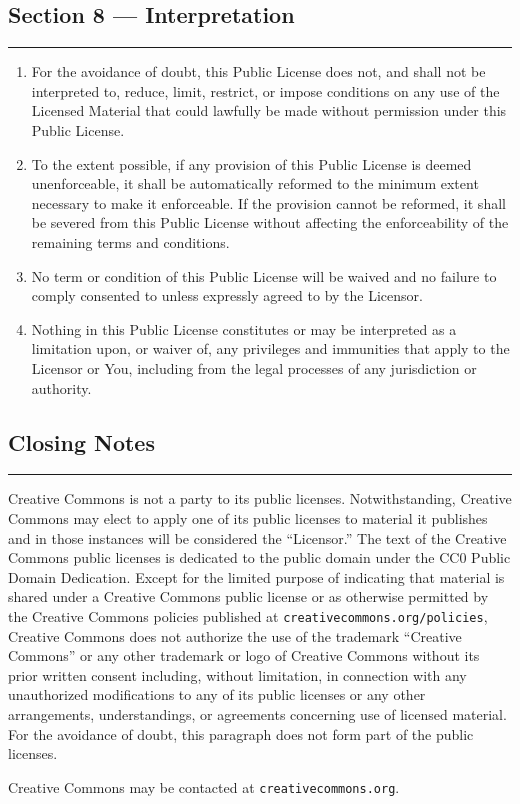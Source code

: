 \subsection*{Section 8 --- Interpretation}
\noindent\rule{\textwidth}{0.3pt}
\smallskip

\begin{enumerate}[label=(\alph*), leftmargin=1.8em, labelwidth=1.5em, align=left, itemsep=0.4em]
	\item For the avoidance of doubt, this Public License does not, and shall not be interpreted to, reduce, limit, restrict, or impose conditions on any use of the Licensed Material that could lawfully be made without permission under this Public License.
	\item To the extent possible, if any provision of this Public License is deemed unenforceable, it shall be automatically reformed to the minimum extent necessary to make it enforceable. If the provision cannot be reformed, it shall be severed from this Public License without affecting the enforceability of the remaining terms and conditions.
	\item No term or condition of this Public License will be waived and no failure to comply consented to unless expressly agreed to by the Licensor.
	\item Nothing in this Public License constitutes or may be interpreted as a limitation upon, or waiver of, any privileges and immunities that apply to the Licensor or You, including from the legal processes of any jurisdiction or authority.
\end{enumerate}

\subsection*{Closing Notes}
\noindent\rule{\textwidth}{0.3pt}
\smallskip

\small
Creative Commons is not a party to its public licenses. Notwithstanding, Creative Commons may elect to apply one of its public licenses to material it publishes and in those instances will be considered the ``Licensor.'' The text of the Creative Commons public licenses is dedicated to the public domain under the CC0 Public Domain Dedication. Except for the limited purpose of indicating that material is shared under a Creative Commons public license or as otherwise permitted by the Creative Commons policies published at \nolinkurl{creativecommons.org/policies}, Creative Commons does not authorize the use of the trademark ``Creative Commons'' or any other trademark or logo of Creative Commons without its prior written consent including, without limitation, in connection with any unauthorized modifications to any of its public licenses or any other arrangements, understandings, or agreements concerning use of licensed material. For the avoidance of doubt, this paragraph does not form part of the public licenses.

\medskip
Creative Commons may be contacted at \nolinkurl{creativecommons.org}.
